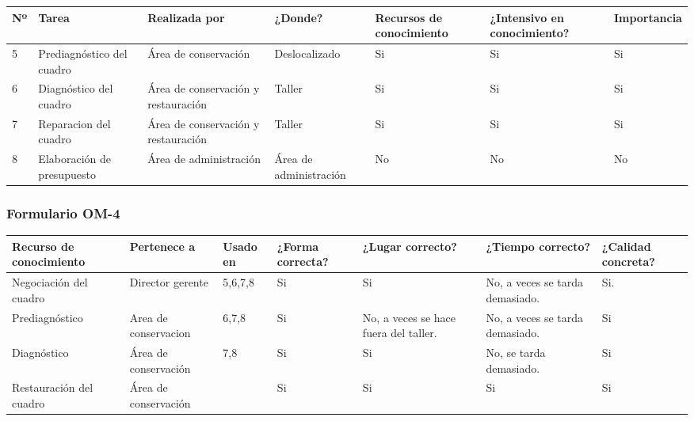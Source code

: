 \documentclass[a4paper,11pt]{article}
\begin{document}
			\begin{landscape}
			\begin{center}
				\begin{tabular}{| l | p{4cm} | p{2.8cm} | p{2cm} | p{2cm} | p{3cm} |
				p{2.2cm} |}
					\hline
					\textbf{Nº} & \textbf{Tarea} & \textbf{Realizada por} & \textbf{¿Donde?} & \textbf{Recursos de conocimiento} &
					\textbf{¿Intensivo en conocimiento?} & \textbf{Importancia}\\
					\hline
					5 & Prediagnóstico del cuadro & Área de conservación & Deslocalizado & Si
					& Si & Si\\
					\hline
					6 & Diagnóstico del cuadro & Área de conservación y restauración & Taller &
					Si & Si & Si\\
					\hline
					7 & Reparacion del cuadro & Área de conservación y restauración & Taller &
					Si & Si & Si\\
					\hline
					8 & Elaboración de presupuesto & Área de administración & Área de
					administración & No & No & No\\
					\hline
				\end{tabular}
			\end{center}
			\end{landscape}
			\newpage
			\begin{landscape}
			\subsubsection{Formulario OM-4}
			\begin{center}
				\begin{tabular}{| p{5cm} | p{2.4cm} | p{2cm} | p{2cm} | p{2cm} | p{2cm} |
				p{2cm} |}
					\hline
					\textbf{Recurso de conocimiento} & \textbf{Pertenece a} & \textbf{Usado en} & \textbf{¿Forma correcta?} & \textbf{¿Lugar correcto?} &
					\textbf{¿Tiempo correcto?} & \textbf{¿Calidad concreta?}\\
					\hline
					Negociación del cuadro & Director gerente & 5,6,7,8 & Si & Si & No, a veces
					se tarda demasiado. & Si.\\
					\hline
					Prediagnóstico & Area de conservacion & 6,7,8 & Si & No, a veces se hace
					fuera del taller. & No, a veces se tarda demasiado. & Si\\
					\hline
					Diagnóstico & Área de conservación & 7,8 & Si & Si & No, se tarda
					demasiado. & Si\\
					\hline
					Restauración del cuadro & Área de conservación & & Si & Si & Si & Si\\
					\hline
				\end{tabular}
			\end{center}
			\end{landscape}
			\newpage
\end{document}
